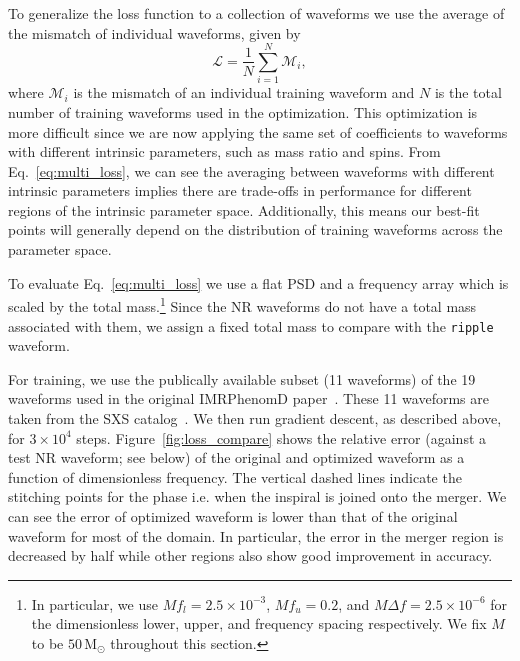 \documentclass[twocolumn]{aastex631}
\newcommand{\ripple}{\texttt{ripple}\xspace}
\newcommand{\amc}[1]{{\color{red}[AC: #1]}}
\begin{document}
To generalize the loss function to a collection of waveforms we use the average of the mismatch of individual waveforms, given by
\begin{equation}
	\mathcal{L}=\frac{1}{N}\sum_{i=1}^{N}\mathcal{M}_i,
    \label{eq:multi_loss}
\end{equation}
where $\mathcal{M}_i$ is the mismatch of an individual training waveform and $N$ is the total number of training waveforms used in the optimization.
This optimization is more difficult since we are now applying the same set of coefficients to waveforms with different intrinsic parameters, such as mass ratio and spins. 
From Eq.~\eqref{eq:multi_loss}, we can see the averaging between waveforms with different intrinsic parameters implies there are trade-offs in performance for different regions of the intrinsic parameter space. 
Additionally, this means our best-fit points will generally depend on the distribution of training waveforms across the parameter space.

To evaluate Eq.~\eqref{eq:multi_loss} we use a flat PSD and a frequency array which is scaled by the total mass.\footnote{
    In particular, we use $M f_l = 2.5 \times 10^{-3}$, $M f_u = 0.2$, and $M\Delta f = 2.5 \times 10^{-6}$ for the dimensionless lower, upper, and frequency spacing respectively. We fix $M$ to be $50\,\mathrm{M}_\odot$ throughout this section.
}
Since the NR waveforms do not have a total mass associated with them, we assign a fixed total mass to compare with the \ripple waveform.

For training, we use the publically available subset (11 waveforms) of the 19 waveforms used in the original IMRPhenomD paper~\citep{Khan:2015jqa}. 
These 11 waveforms are taken from the SXS catalog~\citep{Boyle:2019kee}.
We then run gradient descent, as described above, for $3\times 10^4$ steps. 
Figure~\ref{fig:loss_compare} shows the relative error (against a test NR waveform; see below) of the original and optimized waveform as a function of dimensionless frequency.
The vertical dashed lines indicate the stitching points for the phase i.e. when the inspiral is joined onto the merger.
We can see the error of optimized waveform is lower than that of the original waveform for most of the domain.
In particular, the error in the merger region is decreased by half while other regions also show good improvement in accuracy. 
\end{document}

